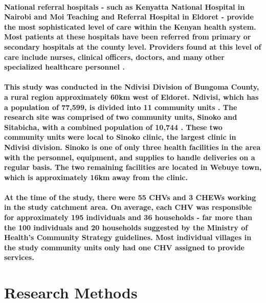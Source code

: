 \paragraph{National referral hospitals - such as Kenyatta National Hospital in Nairobi and Moi Teaching and Referral Hospital in Eldoret -  provide the most sophisticated level of care within the Kenyan health system. Most patients at these hospitals have been referred from primary or secondary hospitals at the county level. Providers found at this level of care include nurses, clinical officers, doctors, and many other specialized healthcare personnel \citep{SPA2010}.}

\paragraph{This study was conducted in the Ndivisi Division of Bungoma County, a rural region approximately 60km west of Eldoret. Ndivisi, which has a population of 77,599, is divided into 11 community units \citep{Census2009}. The research site was comprised of two community units, Sinoko and Sitabicha, with a combined population of 10,744 \citep{Census2009}. These two community units were local to Sinoko clinic, the largest clinic in Ndivisi division. Sinoko is one of only three health facilities in the area with the personnel, equipment, and supplies to handle deliveries on a regular basis. The two remaining facilities are located in Webuye town, which is approximately 16km away from the clinic.}

\paragraph{At the time of the study, there were 55 CHVs and 3 CHEWs working in the study catchment area. On average, each CHV was responsible for approximately 195 individuals and 36 households - far more than the 100 individuals and 20 households suggested by the Ministry of Health's Community Strategy guidelines. Most individual villages in the study community units only had one CHV assigned to provide services.}


\section{Research Methods}


